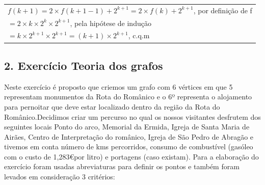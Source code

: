 \documentclass[12pt]{article}
\begin{document}
    \begin{center}
        \begin{tabular}{@{}l@{}}
            \(f(k+1) = 2\times f(k+1-1) + 2^{k+1} = 2 \times f(k) + 2^{k+1}\), por definição de f \\
            \hspace*{1.65cm}\(= 2\times k \times 2^{k} \times 2^{k+1}\), pela hipótese de indução \\
            \hspace*{1.65cm}\(= k \times 2^{k+1} \times 2^{k+1} = (k+1) \times 2^{k+1}\), c.q.m \\
        \end{tabular}
    \end{center}
    \newpage
    
    \subsection{2. Exercício Teoria dos grafos}
    
    
    \noindent Neste exercício é proposto que criemos um grafo com 6 vértices em que 5 representam monumentos da Rota do Românico e o 6º representa o alojamento para pernoitar que deve estar localizado dentro da região da Rota do Românico.Decidimos criar um percurso no qual os nossos visitantes desfrutem dos seguintes locais Ponto do arco, Memorial da Ermida, Igreja de Santa Maria de Airães, Centro de Interpretação do românico, Igreja de São Pedro de Abragão e tivemos em conta número de kms percorridos, consumo de combustível (gasóleo com o custo de 1,283\euro por litro) e portagens (caso existam).
    \newline \newline
    \noindent Para a elaboração do exercício foram usadas abreviaturas para definir os pontos e também foram levados em consideração 3 critérios:
    
\end{document}

